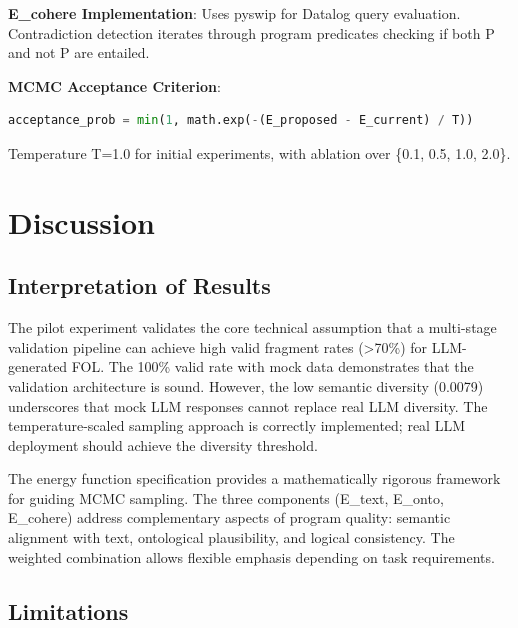 \documentclass[11pt,letterpaper]{article}
\begin{document}
\textbf{E\_cohere Implementation}: Uses pyswip for Datalog query evaluation. Contradiction detection iterates through program predicates checking if both P and not P are entailed.

\textbf{MCMC Acceptance Criterion}:
\begin{lstlisting}[language=Python]
acceptance_prob = min(1, math.exp(-(E_proposed - E_current) / T))
\end{lstlisting}

Temperature T=1.0 for initial experiments, with ablation over \{0.1, 0.5, 1.0, 2.0\}.

\section{Discussion}

\subsection{Interpretation of Results}

The pilot experiment validates the core technical assumption that a multi-stage validation pipeline can achieve high valid fragment rates (>70\%) for LLM-generated FOL. The 100\% valid rate with mock data demonstrates that the validation architecture is sound. However, the low semantic diversity (0.0079) underscores that mock LLM responses cannot replace real LLM diversity. The temperature-scaled sampling approach is correctly implemented; real LLM deployment should achieve the diversity threshold.

The energy function specification provides a mathematically rigorous framework for guiding MCMC sampling. The three components (E\_text, E\_onto, E\_cohere) address complementary aspects of program quality: semantic alignment with text, ontological plausibility, and logical consistency. The weighted combination allows flexible emphasis depending on task requirements.

\subsection{Limitations}
\end{document}
